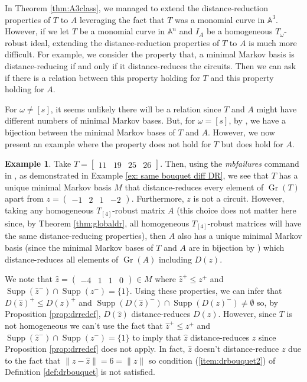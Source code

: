 \documentclass[a4paper, 12pt]{article}
\theoremstyle{plain}
\theoremstyle{definition}
\newtheorem{example}[theorem]{Example}
\theoremstyle{remark}
\begin{document}
In Theorem \ref{thm:A3class}, we managed to extend the distance-reduction properties of $T$ to $A$ leveraging the fact that $T$ was a monomial curve in $\mathbb{A}^3$. However, if we let $T$ be a monomial curve in $\mathbb{A}^n$ and $I_A$ be a homogeneous $T_{\omega}$-robust ideal, extending the distance-reduction properties of $T$ to $A$ is much more difficult. For example, we consider the property that, a minimal Markov basis is distance-reducing if and only if it distance-reduces the circuits. Then we can ask if there is a relation between this property holding for $T$ and this property holding for $A$.

For $\omega \neq [s]$, it seems unlikely there will be a relation since $T$ and $A$ might have different numbers of minimal Markov bases. But, for $\omega=[s]$, by \cite[Theorem 2.2]{kosta2023strongly}, we have a bijection between the minimal Markov bases of $T$ and $A$. However, we now present an example where the property does not hold for $T$ but does hold for $A$.

\begin{example}
    Take $T=\begin{bmatrix}11&19&25&26\end{bmatrix}$. Then, using the \textit{mbfailures} command in \cite{githubM2DistanceReduction},
    as demonstrated in Example \ref{ex: same bouquet diff DR}, we see that $T$ has a unique minimal Markov basis $M$ that distance-reduces every element of $\operatorname{Gr}(T)$ apart from $z=\begin{pmatrix}-1&2&1&-2\end{pmatrix}$. Furthermore, $z$ is not a circuit. However, taking any homogeneous $T_{[4]}$-robust matrix $A$ (this choice does not matter here since, by Theorem \ref{thm:globaldr}, all homogeneous $T_{[4]}$-robust matrices will have the same distance-reducing properties), then $A$ also has a unique minimal Markov basis (since the minimal Markov bases of $T$ and $A$ are in bijection by \cite[Theorem 2.2]{kosta2023strongly}) which distance-reduces all elements of $\operatorname{Gr}(A)$ including $D(z)$. 

    We note that $\hat z=\begin{pmatrix}-4&1&1&0\end{pmatrix} \in M $ where $\hat z^+ \le z^+$ and $\operatorname{Supp}(\hat z^-) \cap \operatorname{Supp}(z^-)=\{1\}$. Using these properties, we can infer that $D(\hat z)^+ \le D(z)^+$ and $\operatorname{Supp}(D(\hat z)^-) \cap \operatorname{Supp}(D(z)^-) \neq \emptyset$ so, by Proposition \ref{prop:drredef}, $D(\hat z)$ distance-reduces $D(z)$. However, since $T$ is not homogeneous we can't use the fact that $\hat z^+ \le z^+$ and $\operatorname{Supp}(\hat z^-) \cap \operatorname{Supp}(z^-)=\{1\}$ to imply that $\hat z$ distance-reduces $z$ since Proposition \ref{prop:drredef} does not apply. In fact, $\hat z$ doesn't distance-reduce $z$ due to the fact that $\lVert z-\hat z\rVert=6=\lVert z \rVert$ so condition (\ref{item:drbouquet2}) of Definition \ref{def:drbouquet} is not satisfied.
\end{example}
\end{document}
